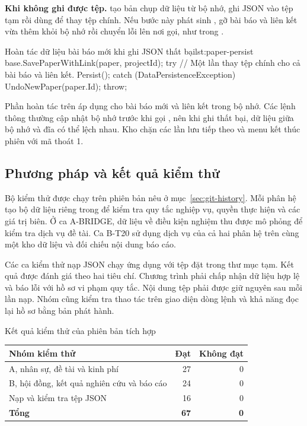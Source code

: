 \textbf{Khi không ghi được tệp.}  tạo bản chụp dữ liệu từ bộ nhớ, ghi JSON vào tệp tạm rồi dùng  để thay tệp chính. Nếu bước này phát sinh ,  gỡ bài báo và liên kết vừa thêm khỏi bộ nhớ rồi chuyển lỗi lên nơi gọi, như trong .

\begin{ReportCode}[firstnumber=60,gobble=8]{Hoàn tác dữ liệu bài báo mới khi ghi JSON thất bại}{lst:paper-persist}
        base.SavePaperWithLink(paper, projectId);
        try
        {
            // Một lần thay tệp chính cho cả bài báo và liên kết.
            Persist();
        }
        catch (DataPersistenceException)
        {
            UndoNewPaper(paper.Id);
            throw;
        }
\end{ReportCode}

Phần hoàn tác trên áp dụng cho bài báo mới và liên kết trong bộ nhớ. Các lệnh  thông thường cập nhật bộ nhớ trước khi gọi , nên khi ghi thất bại, dữ liệu giữa bộ nhớ và đĩa có thể lệch nhau. Kho chặn các lần lưu tiếp theo và menu kết thúc phiên với mã thoát 1.

\label{sec:testing}
\subsection{Phương pháp và kết quả kiểm thử}\label{sec:test-method}

Bộ kiểm thử được chạy trên phiên bản nêu ở mục~\ref{sec:git-history}. Mỗi phân hệ tạo bộ dữ liệu riêng trong  để kiểm tra quy tắc nghiệp vụ, quyền thực hiện và các giá trị biên. Ở ca A-BRIDGE, dữ liệu về điều kiện nghiệm thu được mô phỏng để kiểm tra dịch vụ đề tài. Ca B-T20 sử dụng dịch vụ của cả hai phân hệ trên cùng một kho dữ liệu và đối chiếu nội dung báo cáo.

Các ca kiểm thử nạp JSON chạy ứng dụng với tệp đặt trong thư mục tạm. Kết quả được đánh giá theo hai tiêu chí. Chương trình phải chấp nhận dữ liệu hợp lệ và báo lỗi với hồ sơ vi phạm quy tắc. Nội dung tệp phải được giữ nguyên sau mỗi lần nạp. Nhóm cũng kiểm tra thao tác trên giao diện dòng lệnh và khả năng đọc lại hồ sơ bằng bản phát hành.

\begin{ReportTableHere}
\caption{Kết quả kiểm thử của phiên bản tích hợp}\label{tab:tests-summary}
\small\singlespacing
\begin{tabularx}{\linewidth}{@{}L r r@{}}
\toprule
\textbf{Nhóm kiểm thử} & \textbf{Đạt} & \textbf{Không đạt} \\
\midrule
A, nhân sự, đề tài và kinh phí & 27 & 0 \\
B, hội đồng, kết quả nghiên cứu và báo cáo & 24 & 0 \\
Nạp và kiểm tra tệp JSON & 16 & 0 \\
\midrule
\textbf{Tổng} & \textbf{67} & \textbf{0} \\
\bottomrule
\end{tabularx}
\end{ReportTableHere}

